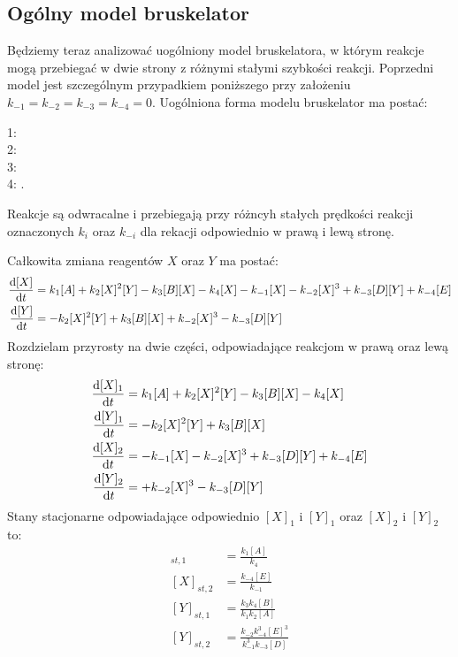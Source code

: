 \documentclass[10pt, a4paper, twoside, onecolumn]{article}
\numberwithin{equation}{section}
\begin{document}
	\subsection{Ogólny model bruskelator}\label{sec:ogolny_model_bruskelator}
	Będziemy teraz analizować uogólniony model bruskelatora, w którym reakcje mogą przebiegać w dwie strony z różnymi stałymi szybkości reakcji. Poprzedni model jest szczególnym przypadkiem poniższego przy założeniu \(k_{-1}=k_{-2}=k_{-3}=k_{-4}=0\). 
	Uogólniona forma modelu bruskelator ma postać:
	\begin{center}
		1:  \\
		2:  \\
		3:  \\
		4: .
	\end{center}
	Reakcje są odwracalne i przebiegają przy różncyh stałych prędkości reakcji oznaczonych \(k_{i}\) oraz \(k_{-i}\) dla rekacji odpowiednio w prawą i lewą stronę. \par
	Całkowita zmiana reagentów \(X\) oraz \(Y\) ma postać:
	\begin{align}
		\dv{[X]}{t} &= k_{1}[A] + k_{2}[X]^{2}[Y] - k_{3}[B][X] - k_{4}[X] - k_{-1}[X] - k_{-2}[X]^{3} + k_{-3}[D][Y] + k_{-4}[E] \\
		\dv{[Y]}{t} &= - k_{2}[X]^{2}[Y] + k_{3}[B][X] + k_{-2}[X]^{3} - k_{-3}[D][Y]
	\end{align}
	Rozdzielam przyrosty na dwie części, odpowiadające reakcjom w prawą oraz lewą stronę:
	\begin{align}
		\dv{[X]_{1}}{t} &= k_{1}[A] + k_{2}[X]^{2}[Y] - k_{3}[B][X] - k_{4}[X] \\
		\dv{[Y]_{1}}{t} &= - k_{2}[X]^{2}[Y] + k_{3}[B][X] \\
		\dv{[X]_{2}}{t} &= - k_{-1}[X] - k_{-2}[X]^{3} + k_{-3}[D][Y] + k_{-4}[E] \\
		\dv{[Y]_{2}}{t} &= + k_{-2}[X]^{3} - k_{-3}[D][Y]
	\end{align}
	Stany stacjonarne odpowiadające odpowiednio \([X]_{1}\) i \([Y]_{1}\) oraz \([X]_{2}\) i \([Y]_{2}\) to:
	\begin{align}
		[X]_{st, 1} &= \frac{k_{1}[A]}{k_{4}} \\
		[X]_{st, 2} &= \frac{k_{-4}[E]}{k_{-1}} \\
		[Y]_{st, 1} &= \frac{k_{3}k_{4}[B]}{k_{1}k_{2}[A]} \\
		[Y]_{st, 2} &= \frac{k_{-2}k_{-4}^{3}[E]^{3}}{k_{-1}^{3}k_{-3}[D]}
	\end{align}
\end{document}
